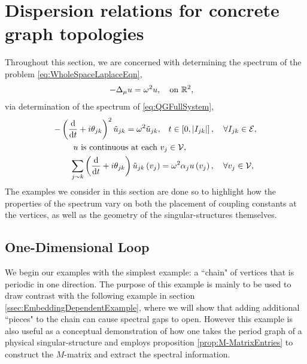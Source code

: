 \section{Dispersion relations for concrete graph topologies} \label{sec:Examples}
Throughout this section, we are concerned with determining the spectrum of the problem \eqref{eq:WholeSpaceLaplaceEqn},
\begin{align*}
	-\Delta_{\mu} u &= \omega^2 u, \quad\text{on } \mathbb{R}^2,
\end{align*}
via determination of the spectrum of \eqref{eq:QGFullSystem},
\begin{align*}
	-\left( \dfrac{\mathrm{d}}{\mathrm{d}t} + i\theta_{jk} \right)^2 \tilde{u}_{jk} = \omega^2 \tilde{u}_{jk}, &\quad t\in\left[ 0,\left\lvert I_{jk} \right\rvert \right], \quad \forall I_{jk}\in \mathcal{E}, \\
	u \text{ is continuous at each } &v_j \in \mathcal{V}, \\
	\sum_{j\sim k}\left( \dfrac{\mathrm{d}}{\mathrm{d}t} + i\theta_{jk} \right)\tilde{u}_{jk}\left( v_j \right) &= \omega^2\alpha_{j}u\left( v_j \right),  \quad \forall v_j \in \mathcal{V},
\end{align*}
The examples we consider in this section are done so to highlight how the properties of the spectrum vary on both the placement of coupling constants at the vertices, as well as the geometry of the singular-structures themselves. 

\subsection{One-Dimensional Loop} \label{ssec:Example1DLoop}
We begin our examples with the simplest example: a ``chain" of vertices that is periodic in one direction.
The purpose of this example is mainly to be used to draw contrast with the following example in section \ref{ssec:EmbeddingDependentExample}, where we will show that adding additional ``pieces" to the chain can cause spectral gaps to open.
However this example is also useful as a conceptual demonstration of how one takes the period graph of a physical singular-structure and employs proposition \ref{prop:M-MatrixEntries} to construct the $M$-matrix and extract the spectral information. \newline

